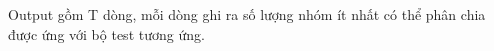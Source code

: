 Output gồm T dòng, mỗi dòng ghi ra số lượng nhóm ít nhất có thể phân chia được ứng với bộ test tương ứng.